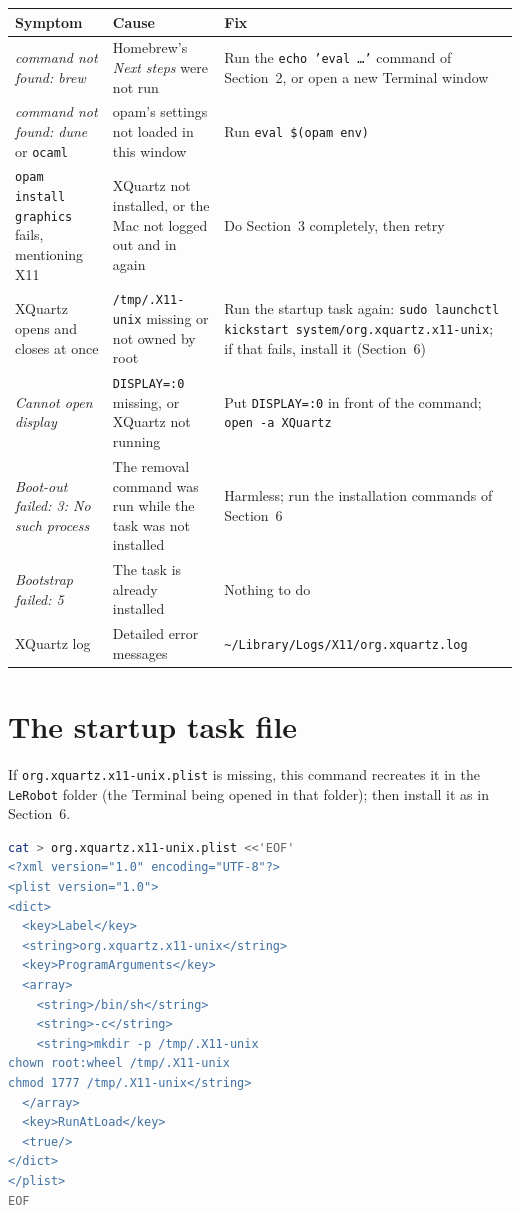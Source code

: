 \documentclass[11pt,a4paper]{article}
\newcommand{\kbd}[1]{\texttt{#1}}
\begin{document}
\begin{tabularx}{\textwidth}{@{}LLL@{}}
\toprule
\textbf{Symptom} & \textbf{Cause} & \textbf{Fix} \\
\midrule
\emph{command not found: brew} & Homebrew's \emph{Next steps} were not run & Run the \kbd{echo 'eval \dots'} command of Section~2, or open a new Terminal window \\
\addlinespace
\emph{command not found: dune} or \kbd{ocaml} & opam's settings not loaded in this window & Run \kbd{eval \$(opam env)} \\
\addlinespace
\kbd{opam install graphics} fails, mentioning X11 & XQuartz not installed, or the Mac not logged out and in again & Do Section~3 completely, then retry \\
\addlinespace
XQuartz opens and closes at once & \kbd{/tmp/\allowbreak .X11-unix} missing or not owned by root & Run the startup task again: \kbd{sudo launchctl kickstart system/\allowbreak org.xquartz.x11-unix}; if that fails, install it (Section~6) \\
\addlinespace
\emph{Cannot open display} & \kbd{DISPLAY=:0} missing, or XQuartz not running & Put \kbd{DISPLAY=:0} in front of the command; \kbd{open -a XQuartz} \\
\addlinespace
\emph{Boot-out failed: 3: No such process} & The removal command was run while the task was not installed & Harmless; run the installation commands of Section~6 \\
\addlinespace
\emph{Bootstrap failed: 5} & The task is already installed & Nothing to do \\
\addlinespace
XQuartz log & Detailed error messages & \kbd{\textasciitilde/\allowbreak Library/\allowbreak Logs/\allowbreak X11/\allowbreak org.xquartz.log} \\
\bottomrule
\end{tabularx}

\appendix
\section{The startup task file}\label{app:plist}

If \kbd{org.xquartz.x11-unix.plist} is missing, this command recreates it
in the \kbd{LeRobot} folder (the Terminal being opened in that folder);
then install it as in
Section~6.
\begin{lstlisting}[language=bash]
cat > org.xquartz.x11-unix.plist <<'EOF'
<?xml version="1.0" encoding="UTF-8"?>
<plist version="1.0">
<dict>
  <key>Label</key>
  <string>org.xquartz.x11-unix</string>
  <key>ProgramArguments</key>
  <array>
    <string>/bin/sh</string>
    <string>-c</string>
    <string>mkdir -p /tmp/.X11-unix
chown root:wheel /tmp/.X11-unix
chmod 1777 /tmp/.X11-unix</string>
  </array>
  <key>RunAtLoad</key>
  <true/>
</dict>
</plist>
EOF
\end{lstlisting}
\end{document}
